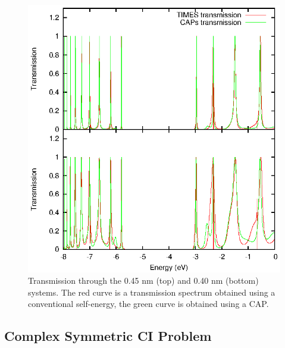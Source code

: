 \begin{figure} 
	\begin{center}
		\includegraphics[width=0.9\linewidth]{figures/transdat.eps}
	\end{center}
	\caption{Transmission through the 0.45 nm (top) and 0.40 nm (bottom)
	         systems. The red curve is a transmission spectrum obtained
		 using a conventional self-energy, the green curve is obtained
		 using a \ac{CAP}.}
	\label{fig:transdat}
\end{figure}

\subsection{Complex Symmetric \ac{CI} Problem}

